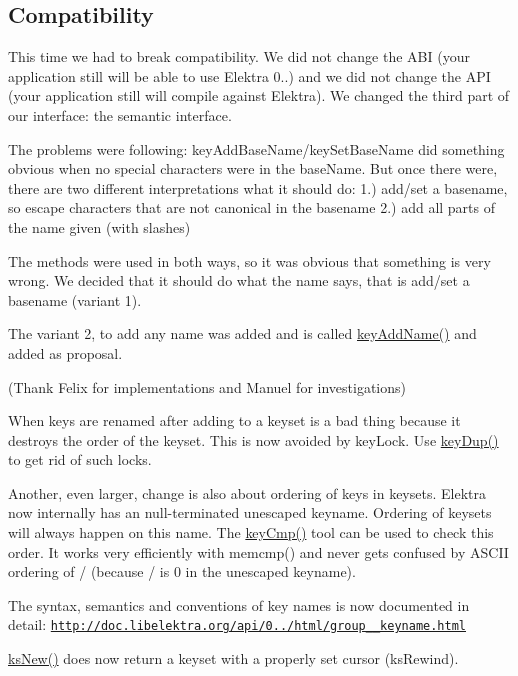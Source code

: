 \subsection*{Compatibility}

This time we had to break compatibility. We did not change the A\+B\+I (your application still will be able to use Elektra 0..) and we did not change the A\+P\+I (your application still will compile against Elektra). We changed the third part of our interface\+: the semantic interface.

The problems were following\+: key\+Add\+Base\+Name/key\+Set\+Base\+Name did something obvious when no special characters were in the base\+Name. But once there were, there are two different interpretations what it should do\+: 1.) add/set a basename, so escape characters that are not canonical in the basename 2.) add all parts of the name given (with slashes)

The methods were used in both ways, so it was obvious that something is very wrong. We decided that it should do what the name says, that is add/set a basename (variant 1).

The variant 2, to add any name was added and is called \hyperlink{group__keyname_gaa70593a2c772c4b7bc33423b9b10a270}{key\+Add\+Name()} and added as proposal.

(Thank Felix for implementations and Manuel for investigations)

When keys are renamed after adding to a keyset is a bad thing because it destroys the order of the keyset. This is now avoided by key\+Lock. Use \hyperlink{group__key_gae6ec6a60cc4b8c1463fa08623d056ce3}{key\+Dup()} to get rid of such locks.

Another, even larger, change is also about ordering of keys in keysets. Elektra now internally has an null-\/terminated unescaped keyname. Ordering of keysets will always happen on this name. The \hyperlink{group__keytest_gaf6e66e12fe04d535a5d1c8218ced803e}{key\+Cmp()} tool can be used to check this order. It works very efficiently with memcmp() and never gets confused by A\+S\+C\+I\+I ordering of / (because / is 0 in the unescaped keyname).

The syntax, semantics and conventions of key names is now documented in detail\+: \href{http://doc.libelektra.org/api/0.8.8/html/group__keyname.html}{\tt http\+://doc.\+libelektra.\+org/api/0../html/group\+\_\+\+\_\+keyname.\+html}

\hyperlink{group__keyset_ga671e1aaee3ae9dc13b4834a4ddbd2c3c}{ks\+New()} does now return a keyset with a properly set cursor (ks\+Rewind).

